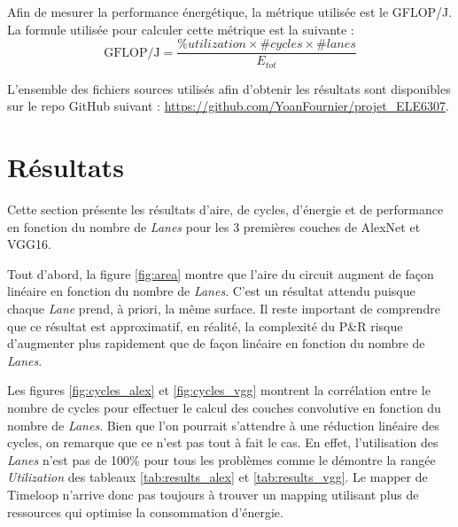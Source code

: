 \documentclass[10pt,letterpaper]{article}
\begin{document}
\begin{multicols}{2}
    Afin de mesurer la performance énergétique, la métrique utilisée est le GFLOP/J. La 
    formule utilisée pour calculer cette métrique est la suivante :
    $$\text{GFLOP/J} = \frac{\%utilization \times \#cycles \times \#lanes}{E_{tot}}$$

    L'ensemble des fichiers sources utilisés afin d'obtenir les résultats sont disponibles
    sur le repo GitHub suivant : \url{https://github.com/YoanFournier/projet_ELE6307}.

    \end{multicols}

\section{Résultats}
    \begin{multicols}{2}

    Cette section présente les résultats d'aire, de cycles, d'énergie et de performance en fonction
    du nombre de \textit{Lanes} pour les 3 premières couches de AlexNet et VGG16.

    Tout d'abord, la figure \ref{fig:area} montre que l'aire du circuit augment de façon linéaire en fonction
    du nombre de \textit{Lanes}. C'est un résultat attendu puisque chaque \textit{Lane} prend, à priori, la même surface.
    Il reste important de comprendre que ce résultat est approximatif, en réalité, la complexité du P\&R risque d'augmenter
    plus rapidement que de façon linéaire en fonction du nombre de \textit{Lanes}.

    Les figures \ref{fig:cycles_alex} et \ref{fig:cycles_vgg} montrent la corrélation entre le nombre de cycles 
    pour effectuer le calcul des couches convolutive en fonction du nombre de \textit{Lanes}. Bien que l'on pourrait
    s'attendre à une réduction linéaire des cycles, on remarque que ce n'est pas tout à fait le cas. En effet, l'utilisation
    des \textit{Lanes} n'est pas de 100\% pour tous les problèmes comme le démontre la rangée \textit{Utilization} des 
    tableaux \ref{tab:results_alex} et \ref{tab:results_vgg}. Le mapper de Timeloop n'arrive donc pas toujours à trouver un 
    mapping utilisant plus de ressources qui optimise la consommation d'énergie.


\end{multicols}
\end{document}
